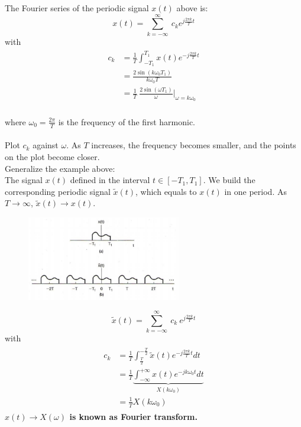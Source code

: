 \begin{ex}{}
    The Fourier series of the periodic signal $x(t)$ above is:
    \[ 
    x(t) =  \sum_{k=-\infty}^{\infty} \ c_{k} e^{j\frac{2\pi k}{T}t}
    \]
    with
    \begin{align*}
    \begin{split}
        c_{k} 
        &= \frac{1}{T} \int_{-T_{1}}^{T_{1}} x(t)e^{-j\frac{2\pi k}{T}t} \\
        &= \frac{2 \sin(k \omega_{0} T_{1})}{k \omega_{0} T} \\
        &=\frac{1}{T} \ \frac{2 \sin(\omega T_{1})}{\omega} \bigg\rvert_{\omega = k \omega_{0}} 
    \end{split} 
    \end{align*}\\
    where $\omega_{0}=\frac{2\pi}{T}$ is the frequency of the first harmonic.\\\\
    Plot $c_{k}$ against $\omega$. As $T$ increases, the frequency becomes smaller, and the points on the plot become closer.\\
    
    Generalize the example above:\\
    The signal $x(t)$ defined in the interval $t \in [-T_{1}, T_{1}]$. We build the corresponding periodic signal $\tilde{x}(t)$, which equals to $x(t)$ in one period. As $T \to \infty$, $\tilde{x}(t) \to x(t)$.
    \begin{figure}[H] 
        \centering 
        \includegraphics[width = 0.6\textwidth]{images/tildex} 
    \end{figure}
    
    \[ 
        \tilde{x}(t) = \sum_{k=-\infty}^{\infty} \ c_{k} \ e^{j\frac{2\pi k}{T}t} 
    \]
    \quad with
    \begin{align*}
    \begin{split}
        c_{k} 
        &= \frac{1}{T} \int_{\frac{T}{2}}^{-\frac{T}{2}} \tilde{x}(t)e^{-j\frac{2\pi k}{T}t} dt \\
        &= \frac{1}{T} \underbrace{\int_{-\infty}^{+\infty} x(t)e^{-j k \omega_{0} t} dt}_{X(k\omega_{0})}\\
        &=\frac{1}{T} X(k\omega_{0}) 
    \end{split}
    \end{align*}
    \textbf{ $x(t) \to X(\omega)$ is known as Fourier transform.}
    

\end{ex}
